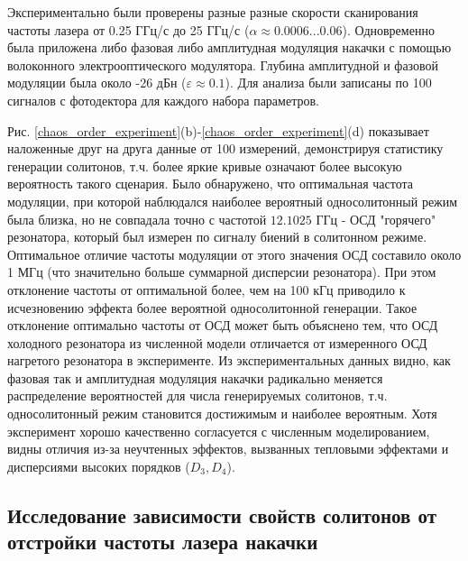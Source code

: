 Экспериментально были проверены разные разные скорости сканирования частоты лазера от 0.25 ГГц/с до 25 ГГц/с ($\alpha \approx 0.0006...0.06$). Одновременно была приложена либо фазовая либо амплитудная модуляция накачки с помощью волоконного электрооптического модулятора. Глубина амплитудной и фазовой модуляции была около -26 дБн ($\varepsilon \approx 0.1$). Для анализа были записаны по 100 сигналов с фотодектора для каждого набора параметров.

Рис. \ref{chaos_order_experiment}(b)-\ref{chaos_order_experiment}(d) показывает наложенные друг на друга данные от 100 измерений, демонстрируя статистику генерации солитонов, т.ч. более яркие кривые означают более высокую вероятность такого сценария. Было обнаружено, что оптимальная частота модуляции, при которой наблюдался наиболее вероятный односолитонный режим была близка, но не совпадала точно с частотой $12.1025$ ГГц - ОСД "горячего" резонатора, который был измерен по сигналу биений в солитонном режиме. Оптимальное отличие частоты модуляции от этого значения ОСД составило около 1 МГц (что значительно больше суммарной дисперсии резонатора). При этом отклонение частоты от оптимальной более, чем на 100 кГц приводило к исчезновению эффекта более вероятной односолитонной генерации. Такое отклонение оптимально частоты от ОСД может быть объяснено тем, что ОСД холодного резонатора из численной модели отличается от измеренного ОСД нагретого резонатора в эксперименте. Из экспериментальных данных видно, как фазовая так и амплитудная модуляция накачки радикально меняется распределение вероятностей для числа генерируемых солитонов, т.ч. односолитонный режим становится достижимым и наиболее вероятным. Хотя эксперимент хорошо качественно согласуется с численным моделированием, видны отличия из-за неучтенных эффектов, вызванных тепловыми эффектами и дисперсиями высоких порядков ($D_3, D_4$).

\subsection{Исследование зависимости свойств солитонов от отстройки частоты лазера накачки}

